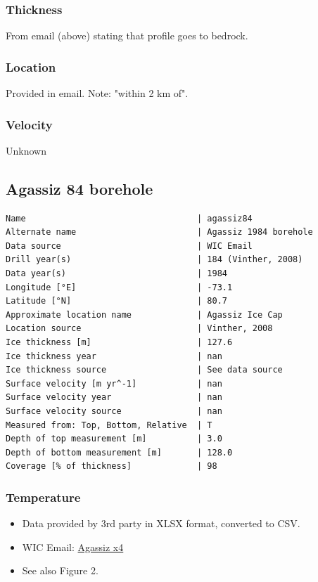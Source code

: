 \documentclass[article,a4paper,times,11pt,twoside]{article}
\begin{document}
\subsubsection{Thickness}
\label{sec:org04b53b1}

From email (above) stating that profile goes to bedrock.

\subsubsection{Location}
\label{sec:org0baeb48}

Provided in email. Note: "within 2 km of".

\subsubsection{Velocity}
\label{sec:org5abab91}

Unknown
\clearpage
\subsection{Agassiz 84 borehole}
\label{sec:org4eaf90f}
\begin{verbatim}
Name                                  | agassiz84
Alternate name                        | Agassiz 1984 borehole
Data source                           | WIC Email
Drill year(s)                         | 184 (Vinther, 2008)
Data year(s)                          | 1984
Longitude [°E]                        | -73.1
Latitude [°N]                         | 80.7
Approximate location name             | Agassiz Ice Cap
Location source                       | Vinther, 2008
Ice thickness [m]                     | 127.6
Ice thickness year                    | nan
Ice thickness source                  | See data source
Surface velocity [m yr^-1]            | nan
Surface velocity year                 | nan
Surface velocity source               | nan
Measured from: Top, Bottom, Relative  | T
Depth of top measurement [m]          | 3.0
Depth of bottom measurement [m]       | 128.0
Coverage [% of thickness]             | 98
\end{verbatim}

\subsubsection{Temperature}
\label{sec:org824a6ed}

\begin{itemize}
\item Data provided by 3rd party in XLSX format, converted to CSV.
\item WIC Email: \href{msgid:AM0PR04MB6129DE88C9253A951702EE06A2F30@AM0PR04MB6129.eurprd04.prod.outlook.com}{Agassiz x4}
\item See also \textcite{clarke_1987_wind} Figure 2.
\end{itemize}
\end{document}
